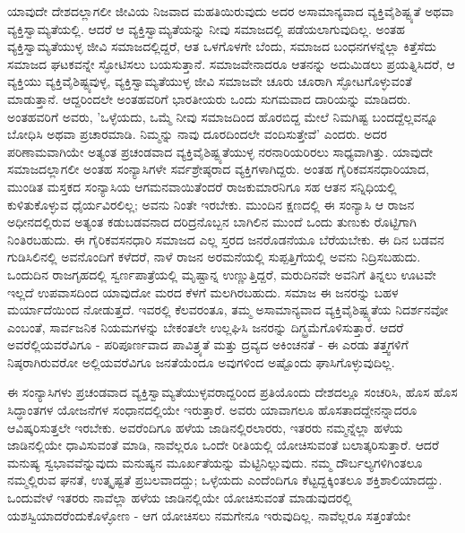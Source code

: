 ಯಾವುದೇ ದೇಶದಲ್ಲಾಗಲೀ ಜೀವಿಯ ನಿಜವಾದ ಮಹತಿಯಿರುವುದು ಅದರ ಅಸಾಮಾನ್ಯವಾದ ವ್ಯಕ್ತಿವೈಶಿಷ್ಟ್ಯತೆ ಅಥವಾ ವ್ಯಕ್ತಿಸ್ವಾಮ್ಯತೆಯಲ್ಲಿ. ಆದರೆ ಆ ವ್ಯಕ್ತಿಸ್ವಾಮ್ಯತೆಯನ್ನು ನೀವು ಸಮಾಜದಲ್ಲಿ ಪಡೆಯಲಾಗುವುದಿಲ್ಲ. ಅಂತಹ ವ್ಯಕ್ತಿಸ್ವಾಮ್ಯತೆಯುಳ್ಳ ಜೀವಿ ಸಮಾಜದಲ್ಲಿದ್ದರೆ, ಆತ ಒಳಗೊಳಗೇ ಬೆಂದು, ಸಮಾಜದ ಬಂಧನಗಳನ್ನೆಲ್ಲಾ ಕಿತ್ತೆಸೆದು ಸಮಾಜದ ಘಟಕವನ್ನೇ ಸ್ಫೋಟಿಸಲು ಬಯಸುತ್ತಾನೆ. ಸಮಾಜವೇನಾದರೂ ಆತನನ್ನು ಅದುಮಿಡಲು ಪ್ರಯತ್ನಿಸಿದರೆ, ಆ ವ್ಯಕ್ತಿಯು ವ್ಯಕ್ತಿವೈಶಿಷ್ಟ್ಯವುಳ್ಳ, ವ್ಯಕ್ತಿಸ್ವಾಮ್ಯತೆಯುಳ್ಳ ಜೀವಿ ಸಮಾಜವೇ ಚೂರು ಚೂರಾಗಿ ಸ್ಫೋಟಗೊಳ್ಳುವಂತೆ ಮಾಡುತ್ತಾನೆ. ಆದ್ದರಿಂದಲೇ ಅಂತಹವರಿಗೆ ಭಾರತೀಯರು ಒಂದು ಸುಗಮವಾದ ದಾರಿಯನ್ನು ಮಾಡಿದರು. ಅಂತಹವರಿಗೆ ಅವರು, 'ಒಳ್ಳೆಯದು, ಒಮ್ಮೆ ನೀವು ಸಮಾಜದಿಂದ ಹೊರಬಿದ್ದ ಮೇಲೆ ನಿಮಗಿಷ್ಟ ಬಂದದ್ದೆಲ್ಲವನ್ನೂ ಬೋಧಿಸಿ ಅಥವಾ ಪ್ರಚಾರಮಾಡಿ. ನಿಮ್ಮನ್ನು ನಾವು ದೂರದಿಂದಲೇ ವಂದಿಸುತ್ತೇವೆ' ಎಂದರು. ಅದರ ಪರಿಣಾಮವಾಗಿಯೇ ಅತ್ಯಂತ ಪ್ರಚಂಡವಾದ ವ್ಯಕ್ತಿವೈಶಿಷ್ಟ್ಯತೆಯುಳ್ಳ ನರನಾರಿಯರಿರಲು ಸಾಧ್ಯವಾಗಿತ್ತು. ಯಾವುದೇ ಸಮಾಜದಲ್ಲಾಗಲೀ ಅಂತಹ ಸಂನ್ಯಾಸಿಗಳೇ ಸರ್ವಶ್ರೇಷ್ಠರಾದ ವ್ಯಕ್ತಿಗಳಾಗಿದ್ದರು. ಅಂತಹ ಗೈರಿಕವಸನಧಾರಿಯಾದ, ಮುಂಡಿತ ಮಸ್ತಕದ ಸಂನ್ಯಾಸಿಯ ಆಗಮನವಾಯಿತೆಂದರೆ ರಾಜಕುಮಾರನಿಗೂ ಸಹ ಆತನ ಸನ್ನಿಧಿಯಲ್ಲಿ ಕುಳಿತುಕೊಳ್ಳುವ ಧೈರ್ಯವಿರಲಿಲ್ಲ; ಅವನು ನಿಂತೇ ಇರಬೇಕು. ಮುಂದಿನ ಕ್ಷಣದಲ್ಲಿ ಈ ಸಂನ್ಯಾಸಿ ಆ ರಾಜನ ಅಧೀನದಲ್ಲಿರುವ ಅತ್ಯಂತ ಕಡುಬಡವನಾದ ದರಿದ್ರನೊಬ್ಬನ ಬಾಗಿಲಿನ ಮುಂದೆ ಒಂದು ತುಣುಕು ರೊಟ್ಟಿಗಾಗಿ ನಿಂತಿರಬಹುದು. ಈ ಗೈರಿಕವಸನಧಾರಿ ಸಮಾಜದ ಎಲ್ಲ ಸ್ತರದ ಜನರೊಡನೆಯೂ ಬೆರೆಯಬೇಕು. ಈ ದಿನ ಬಡವನ ಗುಡಿಸಿಲಿನಲ್ಲಿ ಅವನೊಂದಿಗೆ ಕಳೆದರೆ, ನಾಳೆ ರಾಜನ ಅರಮನೆಯಲ್ಲಿ ಸುಪ್ಪತ್ತಿಗೆಯಲ್ಲಿ ಅವನು ನಿದ್ರಿಸಬಹುದು. ಒಂದುದಿನ ರಾಜಗೃಹದಲ್ಲಿ ಸ್ವರ್ಣಪಾತ್ರೆಯಲ್ಲಿ ಮೃಷ್ಟಾನ್ನ ಉಣ್ಣುತ್ತಿದ್ದರೆ, ಮರುದಿನವೇ ಅವನಿಗೆ ತಿನ್ನಲು ಊಟವೇ ಇಲ್ಲದೆ ಉಪವಾಸದಿಂದ ಯಾವುದೋ ಮರದ ಕೆಳಗೆ ಮಲಗಿರಬಹುದು. ಸಮಾಜ ಈ ಜನರನ್ನು ಬಹಳ ಮರ್ಯಾದೆಯಿಂದ ನೋಡುತ್ತದೆ. ಇವರಲ್ಲಿ ಕೆಲವರಂತೂ, ತಮ್ಮ ಅಸಾಮಾನ್ಯವಾದ ವ್ಯಕ್ತಿವೈಶಿಷ್ಟ್ಯತೆಯ ನಿದರ್ಶನವೋ ಎಂಬಂತೆ, ಸಾರ್ವಜನಿಕ ನಿಯಮಗಳನ್ನು ಬೇಕಂತಲೇ ಉಲ್ಲಘಿಸಿ ಜನರನ್ನು ದಿಗ್ಭ್ರಮೆಗೊಳಿಸುತ್ತಾರೆ. ಆದರೆ ಅವರೆಲ್ಲಿಯವರೆವಿಗೂ - ಪರಿಪೂರ್ಣವಾದ ಪಾವಿತ್ರ್ಯತೆ ಮತ್ತು ದ್ರವ್ಯದ ಅಕಿಂಚನತೆ - ಈ ಎರಡು ತತ್ತ್ವಗಳಿಗೆ ನಿಷ್ಠರಾಗಿರುವರೋ ಅಲ್ಲಿಯವರೆವಿಗೂ ಜನತೆಯೆಂದೂ ಅವುಗಳಿಂದ ಅಷ್ಟೊಂದು ಘಾಸಿಗೊಳ್ಳುವುದಿಲ್ಲ.

ಈ ಸಂನ್ಯಾಸಿಗಳು ಪ್ರಚಂಡವಾದ ವ್ಯಕ್ತಿಸ್ವಾಮ್ಯತೆಯುಳ್ಳವರಾದ್ದರಿಂದ ಪ್ರತಿಯೊಂದು ದೇಶದಲ್ಲೂ ಸಂಚರಿಸಿ, ಹೊಸ ಹೊಸ ಸಿದ್ಧಾಂತಗಳ ಯೋಜನೆಗಳ ಸಂಧಾನದಲ್ಲಿಯೇ ಇರುತ್ತಾರೆ. ಅವರು ಯಾವಾಗಲೂ ಹೊಸತಾದದ್ದೇನನ್ನಾದರೂ ಆವಿಷ್ಕರಿಸುತ್ತಲೇ ಇರಬೇಕು. ಅವರೆಂದಿಗೂ ಹಳೆಯ ಜಾಡಿನಲ್ಲಿರಲಾರರು, ಇತರರು ನಮ್ಮನ್ನೆಲ್ಲಾ ಹಳೆಯ ಜಾಡಿನಲ್ಲಿಯೇ ಧಾವಿಸುವಂತೆ ಮಾಡಿ, ನಾವೆಲ್ಲರೂ ಒಂದೇ ರೀತಿಯಲ್ಲಿ ಯೋಚಿಸುವಂತೆ ಬಲಾತ್ಕರಿಸುತ್ತಾರೆ. ಆದರೆ ಮನುಷ್ಯ ಸ್ವಭಾವವೆನ್ನುವುದು ಮನುಷ್ಯನ ಮೂರ್ಖತೆಯನ್ನು ಮೆಟ್ಟಿನಿಲ್ಲುವುದು. ನಮ್ಮ ದೌರ್ಬಲ್ಯಗಳಿಗಿಂತಲೂ ನಮ್ಮಲ್ಲಿರುವ ಘನತೆ, ಉತ್ಕೃಷ್ಟತೆ ಪ್ರಬಲವಾದದ್ದು; ಒಳ್ಳೆಯದು ಎಂದೆಂದಿಗೂ ಕೆಟ್ಟದ್ದಕ್ಕಿಂತಲೂ ಶಕ್ತಿಶಾಲಿಯಾದದ್ದು. ಒಂದುವೇಳೆ ಇತರರು ನಾವೆಲ್ಲಾ ಹಳೆಯ ಜಾಡಿನಲ್ಲಿಯೇ ಯೋಚಿಸುವಂತೆ ಮಾಡುವುದರಲ್ಲಿ ಯಶಸ್ವಿಯಾದರೆಂದುಕೊಳ್ಳೋಣ - ಆಗ ಯೋಚಿಸಲು ನಮಗೇನೂ ಇರುವುದಿಲ್ಲ. ನಾವೆಲ್ಲರೂ ಸತ್ತಂತೆಯೇ

